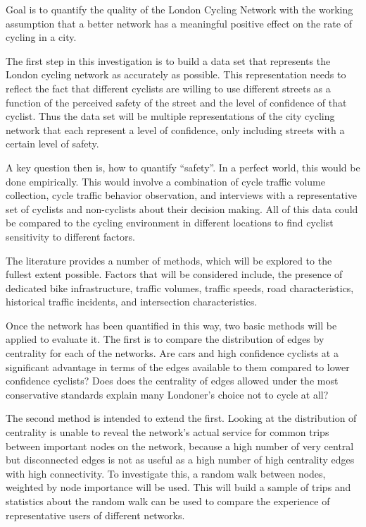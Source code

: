 \documentclass[11pt]{article} %
\begin{document}
Goal is to quantify the quality of the London Cycling Network with the working assumption that a better network has a meaningful positive effect on the rate of cycling in a city. 

The first step in this investigation is to build a data set that represents the London cycling network as accurately as possible. This representation needs to reflect the fact that different cyclists are willing to use different streets as a function of the perceived safety of the street and the level of confidence of that cyclist. Thus the data set will be multiple representations of the city cycling network that each represent a level of confidence, only including streets with a certain level of safety. 

A key question then is, how to quantify ``safety''. In a perfect world, this would be done empirically. This would involve a combination of cycle traffic volume collection, cycle traffic behavior observation, and interviews with a representative set of cyclists and non-cyclists about their decision making. All of this data could be compared to the cycling environment in different locations to find cyclist sensitivity to different factors.  

The literature provides a number of methods, which will be explored to the fullest extent possible. Factors that will be considered include, the presence of dedicated bike infrastructure, traffic volumes, traffic speeds, road characteristics, historical traffic incidents, and intersection characteristics. 

Once the network has been quantified in this way, two basic methods will be applied to evaluate it. The first is to compare the distribution of edges by centrality for each of the networks. Are cars and high confidence cyclists at a significant advantage in terms of the edges available to them compared to lower confidence cyclists? Does does the centrality of edges allowed under the most conservative standards explain many Londoner's choice not to cycle at all? 

The second method is intended to extend the first. Looking at the distribution of centrality is unable to reveal the network's actual service for common trips between important nodes on the network, because a high number of very central but disconnected edges is not as useful as a high number of high centrality edges with high connectivity. To investigate this, a random walk between nodes, weighted by node importance will be used. This will build a sample of trips and statistics about the random walk can be used to compare the experience of representative users of different networks. 
\end{document}
